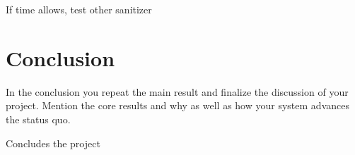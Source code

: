 \documentclass[a4paper,11pt,oneside]{report}
\begin{document}
If time allows, test other sanitizer




\chapter{Conclusion}

In the conclusion you repeat the main result and finalize the discussion of
your project. Mention the core results and why as well as how your system
advances the status quo.

Concludes the project 
\cleardoublepage
{}
{}
\printbibliography

%
%
\end{document}
